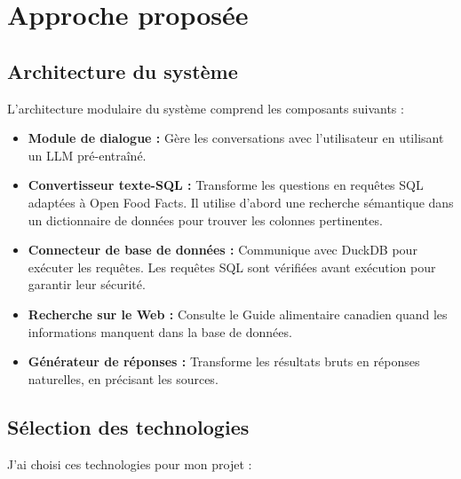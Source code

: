 \documentclass[a4paper,11pt]{article}
\begin{document}
\section{Approche proposée}
\label{sec:approche}

\subsection{Architecture du système}

L'architecture modulaire du système comprend les composants suivants :

\begin{itemize}
    \item \textbf{Module de dialogue :} Gère les conversations avec l'utilisateur en utilisant un LLM pré-entraîné.
    \item \textbf{Convertisseur texte-SQL :} Transforme les questions en requêtes SQL adaptées à 
    Open Food Facts. Il utilise d'abord une recherche sémantique dans un dictionnaire de données pour trouver les colonnes pertinentes.
    \item \textbf{Connecteur de base de données :} Communique avec DuckDB pour exécuter les requêtes. Les requêtes SQL sont vérifiées avant exécution pour garantir leur sécurité.
    \item \textbf{Recherche sur le Web :} Consulte le Guide alimentaire canadien quand les informations manquent dans la base de données.
    \item \textbf{Générateur de réponses :} Transforme les résultats bruts en réponses naturelles, en précisant les sources.
\end{itemize}

\subsection{Sélection des technologies}

J'ai choisi ces technologies pour mon projet :
\end{document}
